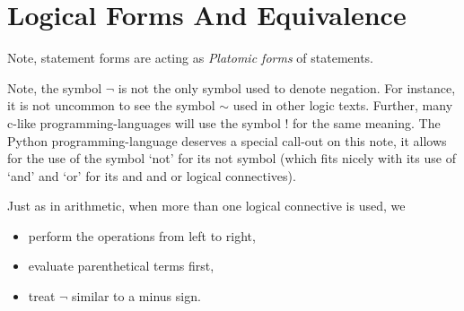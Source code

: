 \guard

\section{Logical Forms And Equivalence}
\label{sec:logicalFormsAndEquivalence}



Note, statement forms are acting as {\it Platomic forms} of statements.



Note, the symbol $\neg$ is not the only symbol used to denote negation.
For instance, it is not uncommon to see the symbol $\sim$ used in other logic texts.
Further, many c-like programming-languages will use the symbol $!$ for the same meaning.
The Python programming-language deserves a special call-out on this note, it allows for the use of the symbol `not' for its not symbol (which fits nicely with its use of `and' and `or' for its and and or logical connectives).




Just as in arithmetic, when more than one logical connective is used, we
\begin{itemize}
  \item perform the operations from left to right,
  \item evaluate parenthetical terms first,
  \item treat $\neg$ similar to a minus sign.
\end{itemize}





















